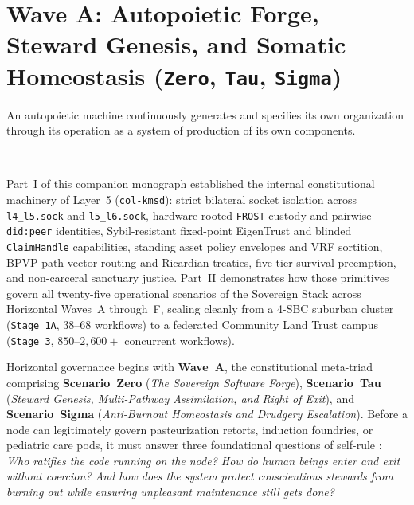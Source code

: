 \chapter{Wave A: Autopoietic Forge, Steward Genesis, and Somatic Homeostasis (\texttt{Zero}, \texttt{Tau}, \texttt{Sigma})}
\label{ch:l5-wave-a}

\epigraph{An autopoietic machine continuously generates and specifies its own organization through its operation as a system of production of its own components.}{---\textcite{maturana1980}}

Part~I of this companion monograph established the internal constitutional machinery of Layer~5
(\texttt{col-kmsd}): strict bilateral socket isolation across \texttt{l4\_l5.sock} and
\texttt{l5\_l6.sock}, hardware-rooted \texttt{FROST} custody and pairwise \texttt{did:peer}
identities, Sybil-resistant fixed-point EigenTrust and blinded \texttt{ClaimHandle} capabilities,
standing asset policy envelopes and VRF sortition, BPVP path-vector routing and Ricardian treaties,
five-tier survival preemption, and non-carceral sanctuary justice. Part~II demonstrates how those
primitives govern all twenty-five operational scenarios of the Sovereign Stack across Horizontal
Waves~A through~F, scaling cleanly from a 4-SBC suburban cluster (\texttt{Stage 1A}, $38\text{--}68$
workflows) to a federated Community Land Trust campus (\texttt{Stage 3}, $850\text{--}2{,}600+$
concurrent workflows).

Horizontal governance begins with \textbf{Wave~A}, the constitutional meta-triad comprising
\textbf{Scenario~Zero} (\textit{The Sovereign Software Forge}), \textbf{Scenario~Tau}
(\textit{Steward Genesis, Multi-Pathway Assimilation, and Right of Exit}), and
\textbf{Scenario~Sigma} (\textit{Anti-Burnout Homeostasis and Drudgery Escalation}). Before a node
can legitimately govern pasteurization retorts, induction foundries, or pediatric care pods, it
must answer three foundational questions of self-rule \parencite{beer1979,maturana1980,han2015}:
\textit{Who ratifies the code running on the node? How do human beings enter and exit without
coercion? And how does the system protect conscientious stewards from burning out while ensuring
unpleasant maintenance still gets done?}

